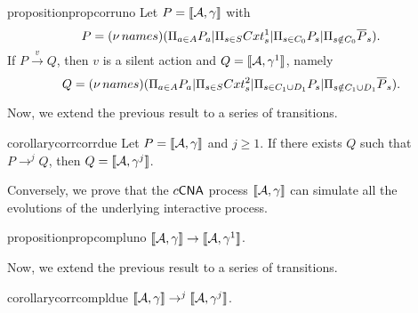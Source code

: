 \begin{restatable}[Correctness 1]{proposition}{propcorruno}
 \label{prop:corr1}
 Let 
 $P=\llbracket{\cal A},\gamma\rrbracket$ with
$$P  = (\nu\, names) (\Pi_{a \in A}P_a| \Pi_{s \in S}Cxt_s^1 | \Pi_{s \in C_0}P_s| \Pi_{s \notin C_0}\overline{P}_s).$$
 If $P \xrightarrow{v}Q$, then
  $v$ is a silent action and $Q = \llbracket {\cal A},\gamma^1\rrbracket$, namely
$$Q= (\nu\, names) (\Pi_{a \in A}P_a| \Pi_{s \in S}Cxt_s^2 | \Pi_{s \in C_1 \cup D_1}P_s| \Pi_{s \notin C_1 \cup D_1}\overline{P}_s).$$
\end{restatable}

Now, we extend the previous result to a series of transitions.
 
 \begin{restatable}[Correctness 2]{corollary}{corrcorrdue} 
 \label{corr:corr2}
  Let $P = \llbracket{\cal A},\gamma\rrbracket$ and $j\geq 1$.
If there exists  $Q$ such that $P \rightarrow^j Q$, then 
$Q =\llbracket{\cal A},\gamma^j\rrbracket$.
\end{restatable}

Conversely, we prove that the $c\textsf{CNA}$ process $\llbracket{\cal A},\gamma\rrbracket$ can simulate all the evolutions  of the underlying interactive process. 

 \begin{restatable}[Completeness 1]{proposition}{propcompluno} 
 \label{prop:compl1}
  $\llbracket{\cal A},\gamma\rrbracket \rightarrow \llbracket{\cal A},\gamma^1\rrbracket$.
 
\end{restatable}

Now, we extend the previous result to a series of transitions.
 
\begin{restatable}[Completeness 2]{corollary}{corrcompldue} 
 \label{corr:compl2}
$\llbracket{\cal A},\gamma\rrbracket \rightarrow^j \llbracket{\cal A},\gamma^j\rrbracket$.  
 \end{restatable}

 
% 
 
  